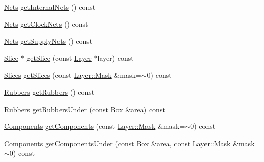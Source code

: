 \begin{DoxyCompactItemize}
\item 
\mbox{\hyperlink{namespaceHurricane_a3404a8b17130a1824f4a281704b04df7}{Nets}} \mbox{\hyperlink{classHurricane_1_1Cell_a0da980d28ad60334da94a3966338f873}{get\+Internal\+Nets}} () const
\item 
\mbox{\hyperlink{namespaceHurricane_a3404a8b17130a1824f4a281704b04df7}{Nets}} \mbox{\hyperlink{classHurricane_1_1Cell_a306f28990f9fd4ccee0e9e8ebecf98fc}{get\+Clock\+Nets}} () const
\item 
\mbox{\hyperlink{namespaceHurricane_a3404a8b17130a1824f4a281704b04df7}{Nets}} \mbox{\hyperlink{classHurricane_1_1Cell_ac51c8f16de7a4af86feead9f1aecf494}{get\+Supply\+Nets}} () const
\item 
\mbox{\hyperlink{classHurricane_1_1Slice}{Slice}} $\ast$ \mbox{\hyperlink{classHurricane_1_1Cell_ac438b5b6b8dbcd868d6bf0deeb469444}{get\+Slice}} (const \mbox{\hyperlink{classHurricane_1_1Layer}{Layer}} $\ast$layer) const
\item 
\mbox{\hyperlink{namespaceHurricane_aa4a7e8a563c5687621eb5e57ade1706a}{Slices}} \mbox{\hyperlink{classHurricane_1_1Cell_aba933a81e3cacfc05b7bd1660e2a933a}{get\+Slices}} (const \mbox{\hyperlink{classHurricane_1_1Layer_af5277c670637bd5d910237e7afe01a91}{Layer\+::\+Mask}} \&mask=$\sim$0) const
\item 
\mbox{\hyperlink{namespaceHurricane_af8923abd57508cc44931a00d61b564ad}{Rubbers}} \mbox{\hyperlink{classHurricane_1_1Cell_a56395a189898d5ae2a869d5a5d5dfdbe}{get\+Rubbers}} () const
\item 
\mbox{\hyperlink{namespaceHurricane_af8923abd57508cc44931a00d61b564ad}{Rubbers}} \mbox{\hyperlink{classHurricane_1_1Cell_a58c6e24401d15f375547ad95b5c2c27c}{get\+Rubbers\+Under}} (const \mbox{\hyperlink{classHurricane_1_1Box}{Box}} \&area) const
\item 
\mbox{\hyperlink{namespaceHurricane_a7d26d99aeb5dd6d70d51bd35d2473e72}{Components}} \mbox{\hyperlink{classHurricane_1_1Cell_a14cb1b1f27e75d4af5b34a9a5956d818}{get\+Components}} (const \mbox{\hyperlink{classHurricane_1_1Layer_af5277c670637bd5d910237e7afe01a91}{Layer\+::\+Mask}} \&mask=$\sim$0) const
\item 
\mbox{\hyperlink{namespaceHurricane_a7d26d99aeb5dd6d70d51bd35d2473e72}{Components}} \mbox{\hyperlink{classHurricane_1_1Cell_a0a3c54d755ab36fe74bd032dfd43b53a}{get\+Components\+Under}} (const \mbox{\hyperlink{classHurricane_1_1Box}{Box}} \&area, const \mbox{\hyperlink{classHurricane_1_1Layer_af5277c670637bd5d910237e7afe01a91}{Layer\+::\+Mask}} \&mask=$\sim$0) const
\item 

\end{DoxyCompactItemize}
